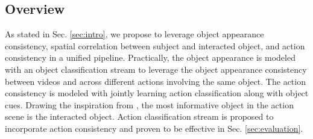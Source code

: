 \subsection{Overview}
As stated in Sec. \ref{sec:intro}, we propose to leverage object appearance consistency, spatial correlation between subject and interacted object, and action consistency in a unified pipeline. Practically, the object appearance is modeled with an object classification stream to leverage the object appearance consistency between videos and across different actions involving the same object. The action consistency is modeled with jointly learning action classification along with object cues. Drawing the inspiration from \cite{gkioxari2015contextual}, the most informative object in the action scene is the interacted object. Action classification stream is proposed to incorporate action consistency and proven to be effective in Sec. \ref{sec:evaluation}. 

